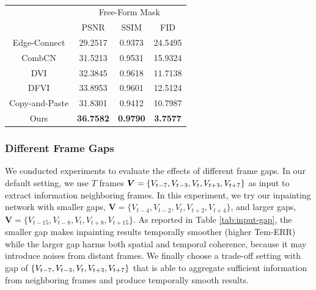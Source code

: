 \begin{table}[t]
	\caption{ }\smallskip
	\scriptsize
	\centering
	{
			\smallskip\begin{tabular}{c|c|c|c}
			\hline
			&\multicolumn{3}{c}{Free-Form Mask} \\
			\cline{2-4} 
			& PSNR & SSIM & FID\\
			
			\hline			
		Edge-Connect \cite{nazeri2019edgeconnect} &29.2517 &0.9373 &  24.5495\\
	\hline
	CombCN \cite{wang2019video} & 31.5213 & 0.9531 & 15.9324 \\
	\hline
	DVI \cite{Kim_2019_CVPR1}&32.3845  &0.9618 & 11.7138 \\
	\hline
	DFVI \cite{Xu_2019_CVPR} & 33.8953 & 0.9601 & 12.5124 \\
	\hline
	Copy-and-Paste \cite{lee2019copy}& 31.8301 &  0.9412  & 10.7987\\	
	\hline
	Ours &\textbf{36.7582} & \textbf{0.9790} &\textbf{3.7577}  \\
	\hline
\end{tabular}
	}
	\label{tab:higherres_com}
\end{table}



{\color{blue}
	\subsubsection{Different Frame Gaps}
%
We conducted experiments to evaluate the effects of different frame gaps. In our default setting, we use $T$ frames $\boldsymbol{V}=\{V_{t-7},V_{t-3},V_{t},V_{t+3},V_{t+7}\}$ as input to extract information neighboring frames. In this experiment, we try our inpainting network with smaller gaps, $\boldsymbol{V}=\{V_{t-4},V_{t-2},V_{t},V_{t+2},V_{t+4}\}$, and larger gaps,
$\boldsymbol{V}=\{V_{t-15},V_{t-8},V_{t},V_{t+8},V_{t+15}\}$. As reported in Table \ref{tab:input-gap}, the smaller gap makes inpainting results temporally smoother (higher Tem-ERR) while the larger gap harms both spatial and temporal coherence, because it may introduce noises from distant frames. We finally choose a trade-off setting with gap of $\{V_{t-7},V_{t-3},V_{t},V_{t+3},V_{t+7}\}$ that is able to aggregate sufficient information from neighboring frames and produce temporally smooth results.}

